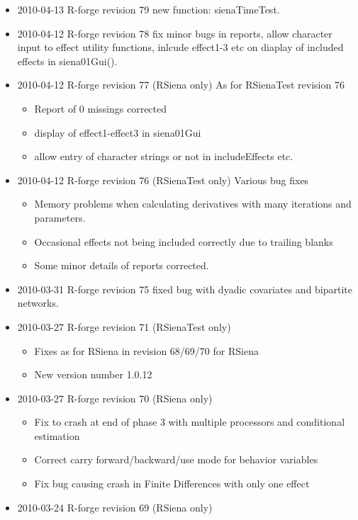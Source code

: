 \documentclass[a4paper,fleqn]{article}
\newcommand{\+}{\, + \,}
\begin{document}
{\begin{itemize}
\item 2010-04-13 R-forge revision 79 new function: sienaTimeTest.
\item 2010-04-12 R-forge revision 78 fix minor bugs in reports, allow character
  input to effect utility functions, inlcude effect1-3 etc on diaplay of
  included effects in siena01Gui().
\item 2010-04-12 R-forge revision 77 (RSiena only) As for RSienaTest revision 76
\begin{itemize}
\item Report of 0 missings corrected
\item display of effect1-effect3 in siena01Gui
\item allow entry of character strings or not in includeEffects etc.
\end{itemize}
\item 2010-04-12 R-forge revision 76 (RSienaTest only) Various bug fixes
\begin{itemize}
\item Memory problems when calculating derivatives with many iterations and
  parameters.
\item Occasional effects not being included correctly due to trailing blanks
\item Some minor details of reports corrected.
\end{itemize}
\item 2010-03-31 R-forge revision 75 fixed bug with dyadic covariates and
  bipartite networks.
\item 2010-03-27 R-forge revision 71 (RSienaTest only)
\begin{itemize}
\item Fixes as for RSiena in revision 68/69/70 for RSiena
\item New version number 1.0.12
\end{itemize}
\item 2010-03-27 R-forge revision 70 (RSiena only)
\begin{itemize}
\item Fix to crash at end of phase 3 with multiple processors and
conditional estimation
\item Correct carry forward/backward/use mode for behavior variables
\item Fix bug causing crash in Finite Differences with only one effect
\end{itemize}
\item 2010-03-24 R-forge revision 69 (RSiena only)
\begin{itemize}

\end{itemize}
\end{itemize}}
\end{document}
